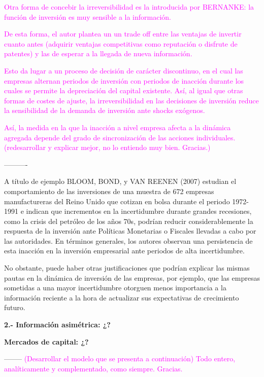 \documentclass[10pt,a4paper]{article}
\begin{document}
\textcolor{magenta}{Otra forma de concebir la irreversibilidad es la introducida por BERNANKE: la función de inversión es muy sensible a la información. 
    
De esta forma, el autor plantea un un trade off entre las ventajas de invertir cuanto antes (adquirir ventajas competitivas como reputación o disfrute de patentes) y las de esperar a la llegada de nueva información. 
    
Esto da lugar a un proceso de decisión de carácter discontinuo, en el cual las empresas alternan periodos de inversión con periodos de inacción durante los cuales se permite la depreciación del capital existente. Así, al igual que otras formas de costes de ajuste, la irreversibilidad en las decisiones de inversión reduce la sensibilidad de la demanda de inversión ante shocks exógenos. 

Así, la medida en la que la inacción a nivel empresa afecta a la dinámica agregada depende del grado de sincronización de las acciones individuales. (redesarrollar y explicar mejor, no lo entiendo muy bien. Gracias.)}
    

----------



A título de ejemplo BLOOM, BOND, y VAN REENEN (2007) estudian el comportamiento de las inversiones de una muestra de 672 empresas manufactureras del Reino Unido que cotizan en bolsa durante el periodo 1972-1991 e indican que incrementos en la incertidumbre durante grandes recesiones, como la crisis del petróleo de los años 70s, podrían reducir considerablemente la respuesta de la inversión ante Políticas Monetarias o Fiscales llevadas a cabo por las autoridades. En términos generales, los autores observan una persistencia de esta inacción en la inversión empresarial ante periodos de alta incertidumbre. 
    
No obstante, puede haber otras justificaciones que podrían explicar las mismas pautas en la dinámica de inversión de las empresas, por ejemplo, que las empresas sometidas a una mayor incertidumbre otorguen menos importancia a la información reciente a la hora de actualizar sus expectativas de crecimiento futuro. 

\textbf{2.- Información asimétrica: ¿?}



\textbf{Mercados de capital: ¿?}


--------
\textcolor{magenta}{(Desarrollar el modelo que se presenta a continuación) Todo entero, analíticamente y complementado, como siempre. Gracias.}
\end{document}
